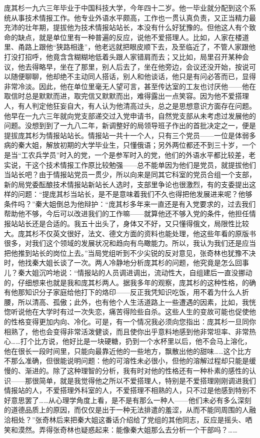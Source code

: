 \par 庞其杉一九六三年毕业于中国科技大学，今年四十二岁。他一毕业就分配到这个系统从事技术情报工作。他专业外语水平颇高，工作也一贯认真负责，又正当精力最充沛的壮年期，提拔他为技术情报站站长，本没有什么好犹豫的。但他这人有个致命的缺点，就是单位里有一种普遍的反应，说他不爱搭理人。比如，人家在楼道里、甬路上跟他“狭路相逢”，他老远就把眼皮顺下去，及至临近了，不管人家跟他打没打招呼，他竟含含糊糊地低着头跟人家错肩而去；又比如，局里召开某种会议，他去得略早，坐在了那里，别人后去了，坐在他旁边，会议还没开始，按说可以随便聊聊，他却绝不主动同人搭话，别人和他谈话，他只是有问必答而已，显得非常冷淡。因此，他在单位里毫无人望可言，甚至传达室的工友也讨厌他——他在取信时总是默默而进，取完信又默默而出，难得露出一点笑容。因为他不爱搭理人，有人判定他狂妄自大，有人认为他清高过头，总之是思想意识方面存在问题。他早在一九六三年就向党支部递交过入党申请书，自然党支部从未考虑过发展他的问题。没想到到了一九八二年，新调整好的局领导班子作出的首批决定之一，便是提拔庞其杉为情报站站长。情报站一共十一个人，只有三个党员——一位是体弱多病的秦大姐，解放初期的大学毕业生，只懂俄语；另外两位都还不到三十岁，一个是当“工农兵学员”时入的党，一个是参军时入的党，他们的外语水平都比较差，老实说，干这个技术情报工作原比较勉强——总不能单因为他们是党员，就提拔他们当站长吧？由于情报站党员一贯少，所以向来是同其它科室的党员合组一个支部，新的局党委酝酿技术情报站新站长人选时，支部里争论也很激烈，有的支委提出这样的问题：“提庞其杉当站长，是不是意味着我们不久也得把他发展进来呢？他够条件吗？”秦大姐倒总为他辩护：“庞其杉多年来一直还是有入党要求的，过去我们帮助他不够，今后可以改进我们的工作嘛——就算他还不够入党的条件，他担任情报站站长还是合适的。我五十出头了，身体又不好，又只懂得俄文，局限性比较大。庞其杉不仅英文很好，法文、德文方面的资料也能处理，他这些年看的原版书很多，对我们这个领域的发展状况和趋向有鸟瞰能力。所以，我认为我们还是应当把他推到站长的岗位上去。”当局党组听到不少尖锐的反对意见，张奇林也犹豫不决时，他找秦大姐长谈了一次。两人冷静地分析庞其杉的问题，他究竟是怎么回事儿？秦大姐沉吟地说：“情报站的人员调进调出，流动性大，自组建后一直没挪动的，仔细想来也就是我和庞其杉两人。据我多年的观察，庞其杉的这种性格，的确有他那知识分子家庭给他打下的烙印——反正我凭知识吃饭，用不着为什么人折腰，所以清高、孤傲；此外，也有他个人生活道路上一些遭遇的因素，比如，我恍惚听说他在大学时有过一次失恋，痛苦得险些自杀。这些人生的变故可能也促使他的性格变得更加内向、冷化。可是，有一个情况我必须向您指出：庞其杉一旦同你相熟了，他也会变得非常活泼健谈，而且使你出乎意料地感到他非常坦率、非常热心……打个比方说，他好比是一块硬糖，扔到一个水杯里以后，他不会马上溶化，他在很长一段时间里，只能向最靠近他的一些地方，飘散出他的甜味……这个比方不那么准确，但很能说明问题：他的可溶性未必很小，但他的溶解过程却只能是缓慢的、渐进的。除了这种理智的分析，我有时对他的性格还有一种朴素的感性的认识——那很简单，就是我觉得他之所以不爱搭理人，特别是不爱搭理刚刚调进我们情报站的人，不爱搭理外科室的人，不爱搭理不相熟的人，只不过是他感到特别不好意思罢了……从心理学角度上看，是不是有那么一种人——他们未必有多么深刻的道德品质上的原因，而仅仅是出于一种无法排遣的羞涩，从而不能同周围的人融洽相处？”张奇林后来把秦大姐这番话介绍给了党组的其他同志，反应是摇头、哂笑和漠然。弄得张奇林也疑惑起来：能像秦大姐那么去分析一个干部吗？……
